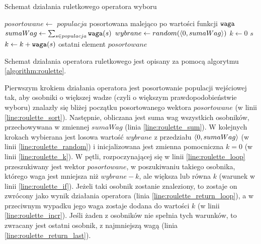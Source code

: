 \documentclass[./FM_mgr.tex]{subfiles}
\begin{document}
	\begin{algorithm}[h]
		\caption{Schemat działania ruletkowego operatora wyboru \label{algorithm:roulette}}
		\begin{algorithmic}[1]
			\Start
			\Var \label{line:roulette_sort} 
			$posortowane \gets$ $populacja$ posortowana malejąco po wartości funkcji $\mathtt{waga}$
			\Var \label{line:roulette_sum} 
			$sumaWag \gets \sum_{s \in populacja} \mathtt{waga}(s)$
			\Var \label{line:roulette_random} 
			$wybrane \gets random(\langle0, sumaWag\rangle)$
			\Var \label{line:roulette_k} 
			$k \gets 0$
			 \label{line:roulette_loop} 
			\label{line:roulette_if} 
			\State \Return $s$ \label{line:roulette_return_loop} 
			\Else
			\State $k \gets k + \mathtt{waga}(s)$ \label{line:roulette_incr} 
			\EndIf
			\EndFor
			\State \Return ostatni element $posortowane$ \label{line:roulette_return_last} 
			\EndOperator
		\end{algorithmic}
	\end{algorithm}
	
	Schemat działania operatora ruletkowego jest opisany za pomocą algorytmu \ref{algorithm:roulette}.
	
	Pierwszym krokiem działania operatora jest posortowanie populacji wejściowej tak, aby osobniki o większej wadze (czyli o większym prawdopodobieństwie wyboru) znalazły się bliżej początku posortowanego wektora $posortowane$ (w linii \ref{line:roulette_sort}).
	Następnie, obliczana jest suma wag wszystkich osobników, przechowywana w zmiennej $sumaWag$ (linia \ref{line:roulette_sum}).
	W kolejnych krokach wybierana jest losowa wartość $wybrane$ z przedziału $\langle0, sumaWag\rangle$ (w linii \ref{line:roulette_random}) i inicjalizowana jest zmienna pomocniczna $k=0$ (w linii \ref{line:roulette_k}).
	W pętli, rozpoczynającej się w linii \ref{line:roulette_loop} przeszukiwany jest wektor $posortowane$, w poszukiwaniu takiego osobnika, którego waga jest mniejsza niż $wybrane-k$, ale większa lub równa $k$ (warunek w linii \ref{line:roulette_if}). 
	Jeżeli taki osobnik zostanie znaleziony, to zostaje on zwrócony jako wynik działania operatora (linia \ref{line:roulette_return_loop}), a w przeciwnym wypadku jego waga zostaje dodana do wartości $k$ (w linii \ref{line:roulette_incr}).
	Jeśli żaden z osobników nie spełnia tych warunków, to zwracany jest ostatni osobnik, z najmniejszą wagą (linia \ref{line:roulette_return_last}).
	
\end{document}
